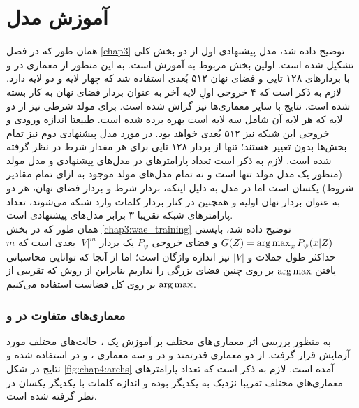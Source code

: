 \section{آموزش مدل}
همان طور که در فصل \ref{chap3} توضیح داده شد، مدل پیشنهادی اول از دو بخش کلی تشکیل شده است. اولین بخش مربوط به آموزش \wae{} است. به این منظور از معماری \transformer{}در \encoder{} و \decoder{} با بردارهای  \embedding{}
۱۲۸ تایی و فضای نهان ۵۱۲ بُعدی استفاده شد که \encoder{} چهار لایه و \decoder{} دو لایه دارد. لازم به ذکر است که ۴ خروجی اولِ لایه آخر \encoder{} به عنوان بردار فضای نهان به کار بسته شده است. نتایج با سایر معماری‌ها نیز گزاش شده‌ است. برای مولد شرطی نیز از دو لایه  که هر لایه آن شامل سه لایه  است بهره برده شده است. طبیعتا اندازه ورودی و خروجی این شبکه نیز ۵۱۲ بُعدی خواهد بود. در مورد مدل پیشنهادی دوم نیز تمام بخش‌ها بدون تغییر هستند؛ تنها از بردار \embedding{}
۱۲۸ تایی برای هر مقدار شرط در نظر گرفته شده است. لازم به ذکر است تعداد پارامتر‌های \decoder{} در مدل‌های پیشنهادی و مدل مولد \sentigan{} (منظور یک مدل مولد تنها است و نه تمام مدل‌های مولد موجود به ازای تمام مقادیر شروط) یکسان است اما در مدل \towardctg{} به دلیل اینکه، بردار شرط و بردار فضای نهان، هر دو به عنوان بردار نهان اولیه  و همچنین در کنار بردار \embedding{} کلمات وارد شبکه می‌شوند، تعداد پارامتر‌های شبکه \towardctg{} تقریبا ۳ برابر مدل‌های پیشنهادی است.
\\
همان طور که در بخش \ref{chap3:wae_training} توضیح داده شد، \decoder{} بایستی
$G(Z) = \operatorname*{arg\,max}_{x} P_\psi(x|Z)$
و فضای خروجی $P_\psi$ یک بردار $|V|^{m}$ بعدی است که $m$ حداکثر طول جملات و $|V|$ نیز اندازه واژگان است؛ اما از آنجا که توانایی محاسباتی یافتن $\operatorname*{arg\,max}$ بر روی چنین فضای بزرگی را نداریم بنابراین از روش
که تقریبی از $\operatorname*{arg\,max}$ بر روی کل فضاست استفاده می‌کنیم.

\subsubsection{معماری‌های متفاوت در \encoder{} و \decoder{}}
به منظور بررسی اثر معماری‌های مختلف بر آموزش یک \wae{}، حالت‌های مختلف مورد آزمایش قرار گرفت. از دو معماری قدرتمند \lstm{} و \transformer{} در \decoder{} و سه معماری \lstm{}، \cnn{}  و \transformer{} در \encoder{} استفاده شده و نتایج در شکل \ref{fig:chap4:archs} آمده است. لازم به ذکر است که تعداد پارامتر‌های معماری‌های مختلف تقریبا نزدیک به یکدیگر بوده و اندازه \embedding{} کلمات با یکدیگر یکسان در نظر گرفته شده است.

